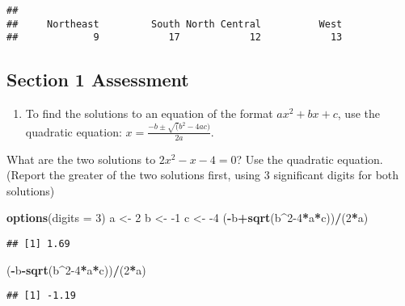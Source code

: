 \documentclass[]{article}
\newenvironment{Shaded}{\begin{snugshade}}{\end{snugshade}}
\newcommand{\DataTypeTok}[1]{\textcolor[rgb]{0.13,0.29,0.53}{#1}}
\newcommand{\DecValTok}[1]{\textcolor[rgb]{0.00,0.00,0.81}{#1}}
\newcommand{\KeywordTok}[1]{\textcolor[rgb]{0.13,0.29,0.53}{\textbf{#1}}}
\newcommand{\NormalTok}[1]{#1}
\newcommand{\OperatorTok}[1]{\textcolor[rgb]{0.81,0.36,0.00}{\textbf{#1}}}
\newcommand{\StringTok}[1]{\textcolor[rgb]{0.31,0.60,0.02}{#1}}
\providecommand{\tightlist}{%
  \setlength{\itemsep}{0pt}\setlength{\parskip}{0pt}}
\begin{document}
\begin{verbatim}
## 
##     Northeast         South North Central          West 
##             9            17            12            13
\end{verbatim}

\hypertarget{section-1-assessment}{%
\subsection{Section 1 Assessment}\label{section-1-assessment}}

\begin{enumerate}
\def\labelenumi{\arabic{enumi}.}
\tightlist
\item
  To find the solutions to an equation of the format \(ax^2+bx+c\), use
  the quadratic equation: \(x=\frac{-b±\sqrt(b^2−4ac)}{2a}\).
\end{enumerate}

What are the two solutions to \(2x^2-x-4=0\)? Use the quadratic
equation. (Report the greater of the two solutions first, using 3
significant digits for both solutions)

\begin{Shaded}
\begin{Highlighting}[]
\KeywordTok{options}\NormalTok{(}\DataTypeTok{digits =} \DecValTok{3}\NormalTok{)}
\NormalTok{a <-}\StringTok{ }\DecValTok{2}
\NormalTok{b <-}\StringTok{ }\DecValTok{-1}
\NormalTok{c <-}\StringTok{ }\DecValTok{-4}
\NormalTok{(}\OperatorTok{-}\NormalTok{b}\OperatorTok{+}\KeywordTok{sqrt}\NormalTok{(b}\OperatorTok{^}\DecValTok{2-4}\OperatorTok{*}\NormalTok{a}\OperatorTok{*}\NormalTok{c))}\OperatorTok{/}\NormalTok{(}\DecValTok{2}\OperatorTok{*}\NormalTok{a)}
\end{Highlighting}
\end{Shaded}

\begin{verbatim}
## [1] 1.69
\end{verbatim}

\begin{Shaded}
\begin{Highlighting}[]
\NormalTok{(}\OperatorTok{-}\NormalTok{b}\OperatorTok{-}\KeywordTok{sqrt}\NormalTok{(b}\OperatorTok{^}\DecValTok{2-4}\OperatorTok{*}\NormalTok{a}\OperatorTok{*}\NormalTok{c))}\OperatorTok{/}\NormalTok{(}\DecValTok{2}\OperatorTok{*}\NormalTok{a)}
\end{Highlighting}
\end{Shaded}

\begin{verbatim}
## [1] -1.19
\end{verbatim}
\end{document}
